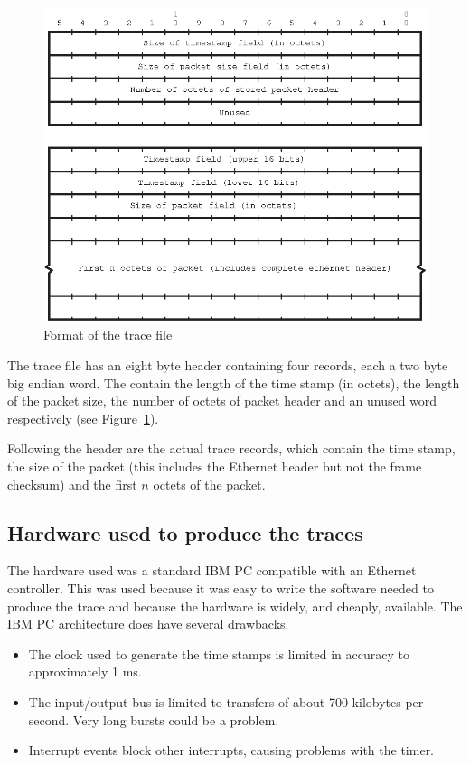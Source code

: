 \begin{figure}
\begin{center}
\leavevmode
\includegraphics{pics/trace-format.eps}
\end{center}
\caption{Format of the trace file}
\label{trace:format}
\end{figure}

The trace file has an eight byte header containing four records, each
a two byte big endian word.  The contain the length of the time stamp
(in octets), the length of the packet size, the number of octets of
packet header and an unused word respectively (see
Figure~\ref{trace:format}).

Following the header are the actual trace records, which contain the
time stamp, the size of the packet (this includes the Ethernet header
but not the frame checksum) and the first $n$ octets of the
packet.

\subsection{Hardware used to produce the traces}

The hardware used was a standard IBM PC compatible with an Ethernet
controller.  This was used because it was easy to write the software
needed to produce the trace and because the hardware is widely, and
cheaply, available.  The IBM PC architecture does have several
drawbacks.

\begin{itemize}
\item	The clock used to generate the time stamps is limited in
accuracy to approximately 1 ms.

\item	The input/output bus is limited to transfers of about 700
kilobytes per second.  Very long bursts could be a problem.

\item	Interrupt events block other interrupts, causing problems
with the timer.
\end{itemize}


